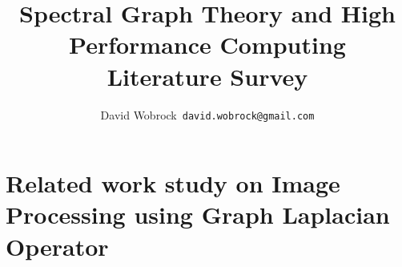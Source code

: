 \documentclass[]{article}
\title{Spectral Graph Theory and High Performance Computing \\ Literature Survey}
\author{David Wobrock\ \texttt{david.wobrock@gmail.com}}
\begin{document}
\maketitle

\section{Related work study on Image Processing using Graph Laplacian Operator}




\clearpage
\printbibliography
\end{document}
